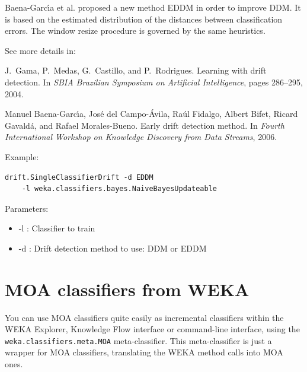 \documentclass[a4paper,12pt,twoside]{book}
\begin{document}
Baena-Garc\'{\i}a et al. proposed a new method EDDM in order to improve DDM. 
It is based on the estimated distribution of the distances between classification errors.
The window resize procedure is governed by the same heuristics.

See more details in:

\begin{itemize}
J.~Gama, P.~Medas, G.~Castillo, and P.~Rodrigues.
\newblock Learning with drift detection.
\newblock In {\em SBIA Brazilian Symposium on Artificial Intelligence}, pages
  286--295, 2004.

Manuel Baena-Garc\'{\i}a, Jos{\'e} del Campo-{\'A}vila, Ra\'ul Fidalgo, Albert
  Bifet, Ricard Gavald\'a, and Rafael Morales-Bueno.
\newblock Early drift detection method.
\newblock In {\em Fourth International Workshop on Knowledge Discovery from
  Data Streams}, 2006.\end{itemize}

Example:
\begin{footnotesize}\begin{verbatim}
drift.SingleClassifierDrift -d EDDM 
    -l weka.classifiers.bayes.NaiveBayesUpdateable
\end{verbatim}\end{footnotesize}

Parameters:
\begin{itemize}
\item -l : Classifier to train
\item -d : Drift detection method to use: DDM or EDDM
\end{itemize}

\section{MOA classifiers from WEKA}

You can use MOA classifiers quite easily as incremental classifiers within the
WEKA Explorer, Knowledge Flow interface or command-line interface, using the \texttt{weka.classifiers.meta.MOA} meta-classifier.
This meta-classifier is just a wrapper for MOA classifiers, translating the
WEKA method calls into MOA ones.
\end{document}
